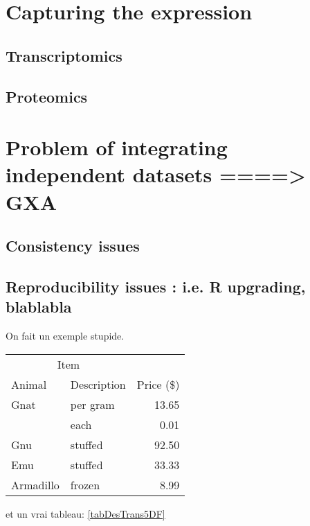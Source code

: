 \section{Capturing the expression}
\subsection{Transcriptomics}
\subsection{Proteomics}

\section{Problem of integrating independent datasets ====> GXA}

\subsection{Consistency issues}

\subsection{Reproducibility issues : i.e. R upgrading, blablabla}
On fait un exemple stupide.



\begin{table}
    \begin{tabular}{@{}llr@{}} \toprule
        \multicolumn{2}{c}{Item} \\ \cmidrule(r){1-2}
        Animal & Description & Price (\$)\\ \midrule
        Gnat & per gram & 13.65 \\
        & each & 0.01 \\
        Gnu & stuffed & 92.50 \\
        Emu & stuffed & 33.33 \\
        Armadillo & frozen & 8.99 \\ \bottomrule
    \end{tabular}
\end{table}



et un vrai tableau: \ref{tabDesTrans5DF}

